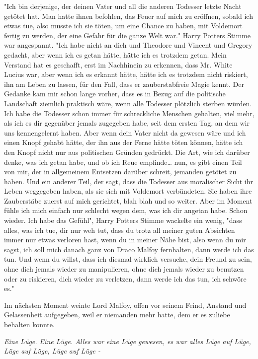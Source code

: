 {"Ich bin derjenige, der deinen Vater und all die anderen Todesser letzte Nacht getötet hat. Man hatte ihnen befohlen, das Feuer auf mich zu eröffnen, sobald ich etwas tue, also musste ich sie töten, um eine Chance zu haben, mit Voldemort fertig zu werden, der eine Gefahr für die ganze Welt war." Harry Potters Stimme war angespannt. "Ich habe nicht an dich und Theodore und Vincent und Gregory gedacht, aber wenn ich es getan hätte, hätte ich es trotzdem getan. Mein Verstand hat es geschafft, erst im Nachhinein zu erkennen, dass Mr. White Lucius war, aber wenn ich es erkannt hätte, hätte ich es trotzdem nicht riskiert, ihn am Leben zu lassen, für den Fall, dass er zauberstabfreie Magie kennt. Der Gedanke kam mir schon lange vorher, dass es in Bezug auf die politische Landschaft ziemlich praktisch wäre, wenn alle Todesser plötzlich sterben würden. Ich habe die Todesser schon immer für schreckliche Menschen gehalten, viel mehr, als ich es dir gegenüber jemals zugegeben habe, seit dem ersten Tag, an dem wir uns kennengelernt haben. Aber wenn dein Vater nicht da gewesen wäre und ich einen Knopf gehabt hätte, der ihn aus der Ferne hätte töten können, hätte ich den Knopf nicht nur aus politischen Gründen gedrückt. Die Art, wie ich darüber denke, was ich getan habe, und ob ich Reue empfinde… nun, es gibt einen Teil von mir, der in allgemeinem Entsetzen darüber schreit, jemanden getötet zu haben. Und ein anderer Teil, der sagt, dass die Todesser aus moralischer Sicht ihr Leben weggegeben haben, als sie sich mit Voldemort verbündeten. Sie haben ihre Zauberstäbe zuerst auf mich gerichtet, blah blah und so weiter. Aber im Moment fühle ich mich einfach nur schlecht wegen dem, was ich dir angetan habe. Schon wieder. Ich habe das Gefühl", Harry Potters Stimme wackelte ein wenig, "dass alles, was ich tue, dir nur weh tut, dass du trotz all meiner guten Absichten immer nur etwas verloren hast, wenn du in meiner Nähe bist, also wenn du mir sagst, ich soll mich danach ganz von Draco Malfoy fernhalten, dann werde ich das tun. Und wenn du willst, dass ich diesmal wirklich versuche, dein Freund zu sein, ohne dich jemals wieder zu manipulieren, ohne dich jemals wieder zu benutzen oder zu riskieren, dich wieder zu verletzen, dann werde ich das tun, ich schwöre es."

Im nächsten Moment weinte Lord Malfoy, offen vor seinem Feind, Anstand und Gelassenheit aufgegeben, weil er niemanden mehr hatte, dem er es zuliebe behalten konnte.

\emph{Eine Lüge. Eine Lüge. Alles war eine Lüge gewesen, es war alles Lüge auf Lüge, Lüge auf Lüge, Lüge auf Lüge -}

}
